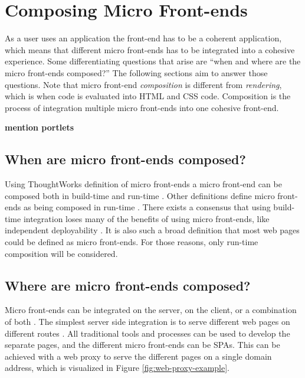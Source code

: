 \section{Composing Micro Front-ends}

As a user uses an application the front-end has to be a coherent application, which means that different micro front-ends has to be integrated into a cohesive experience. Some differentiating questions that arise are ``when and where are the micro front-ends composed?'' The following sections aim to answer those questions. Note that micro front-end \textit{composition} is different from \textit{rendering}, which is when code is evaluated into HTML and CSS code. Composition is the process of integration multiple micro front-ends into one cohesive front-end.

\textbf{mention portlets}

\subsection{When are micro front-ends composed?}

Using ThoughtWorks definition of micro front-ends a micro front-end can be composed both in build-time and run-time \cites{Jackson2019}. Other definitions define micro front-ends as being composed in run-time \cite{Geers2020}. There exists a consensus that using build-time integration loses many of the benefits of using micro front-ends, like independent deployability \cite{Jackson2019}. It is also such a broad definition that most web pages could be defined as micro front-ends. For those reasons, only run-time composition will be considered.

\subsection{Where are micro front-ends composed?}

Micro front-ends can be integrated on the server, on the client, or a combination of both \cite{Jackson2019}. The simplest server side integration is to serve different web pages on different routes \cite{Jackson2019}. All traditional tools and processes can be used to develop the separate pages, and the different micro front-ends can be \acp{SPA}. This can be achieved with a web proxy to serve the different pages on a single domain address, which is visualized in Figure \ref{fig:web-proxy-example}.

